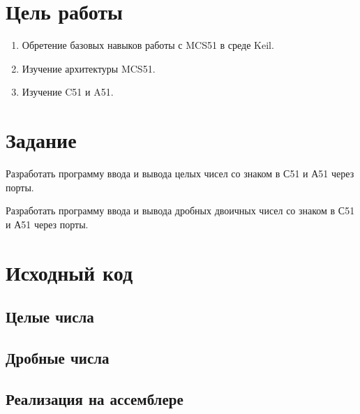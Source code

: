 
\isonefalse
\def \labnum {2}
\def \labsubj {Организация ЭВМ и систем}
\def \labauthor {Айтуганов Д. А. \\ Чебыкин И. Б.}
\def \labgroup {P3301}
\def \labinsp {Скорубский В. И.}
\def \labname {}

\isnametrue
\lstset{
	caption=\lstname,
	basicstyle=\ttfamily\selectfont\scriptsize
}


\section*{Цель работы}
\begin{enumerate}
	\item Обретение базовых навыков работы с MCS51 в среде Keil.
	\item Изучение архитектуры MCS51.
	\item Изучение C51 и A51.
\end{enumerate}
\section*{Задание}
Разработать программу ввода и вывода целых чисел со знаком в С51 и А51
через порты.

Разработать программу ввода и вывода дробных двоичных чисел со знаком в
С51 и А51 через порты.
\section*{Исходный код}
\subsection*{Целые числа}


\subsection*{Дробные числа}


\subsection*{Реализация на ассемблере}






